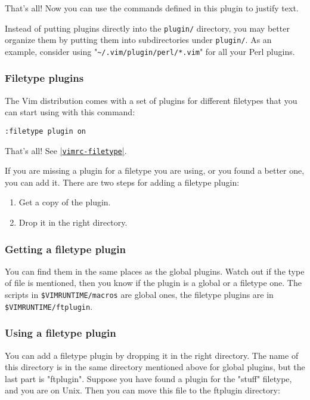 That's all!
Now you can use the commands defined in this plugin to justify text.

Instead of putting plugins directly into the \verb!plugin/! directory, you may better organize them by putting them into subdirectories under \verb!plugin/!.
As an example, consider using "\verb!~/.vim/plugin/perl/*.vim!" for all your Perl plugins.

\subsubsection{Filetype plugins}
\label{add-filetype-plugin}
\label{ftplugin}

The Vim distribution comes with a set of plugins for different filetypes that you can start using with this command:

 \begin{Verbatim}[samepage=true]
 :filetype plugin on
 \end{Verbatim}

That's all!
See \hyperref[vimrc-filetype]{|\texttt{vimrc-filetype}|}.

If you are missing a plugin for a filetype you are using, or you found a better one, you can add it.
There are two steps for adding a filetype plugin:

\begin{enumerate}
				\item Get a copy of the plugin.
				\item Drop it in the right directory.
\end{enumerate}

\subsubsection{Getting a filetype plugin}

You can find them in the same places as the global plugins.
Watch out if the type of file is mentioned, then you know if the plugin is a global or a filetype one.
The scripts in \verb!$VIMRUNTIME/macros! are global ones, the filetype plugins are in \verb!$VIMRUNTIME/ftplugin!.

\subsubsection{Using a filetype plugin}
\label{ftplugin-name}

You can add a filetype plugin by dropping it in the right directory.
The name of this directory is in the same directory mentioned above for global plugins, but the last part is "ftplugin".
Suppose you have found a plugin for the "stuff" filetype, and you are on Unix.
Then you can move this file to the ftplugin directory:

